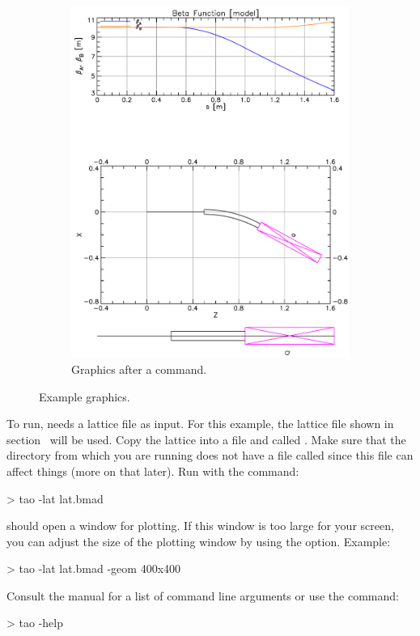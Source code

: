 \documentclass{hitec}
\begin{document}
\begin{figure}[tb]
\begin{subfigure}[b]{0.47\textwidth}
    \includegraphics[width=\textwidth]{lat-floor.pdf}
    \caption{Graphics after a  command.}
    \label{f:lat.floor}
  \end{subfigure}
  \caption{Example \tao graphics.}
\end{figure}

To run, \tao needs a lattice file as input. For this example, the lattice file shown in
section~ will be used. Copy the lattice into a file and called .
Make sure that the directory from which you are running \tao does not have a file called
 since this file can affect things (more on that later). Run \tao with the command:
\begin{code}
> tao -lat lat.bmad
\end{code}
\tao should open a window for plotting. If this window is too large for your screen, you can adjust
the size of the plotting window by using the  option. Example:
\begin{code}
> tao -lat lat.bmad -geom 400x400
\end{code}
Consult the \tao manual for a list of command line arguments or use the command:
\begin{code}
> tao -help
\end{code}
\end{document}

